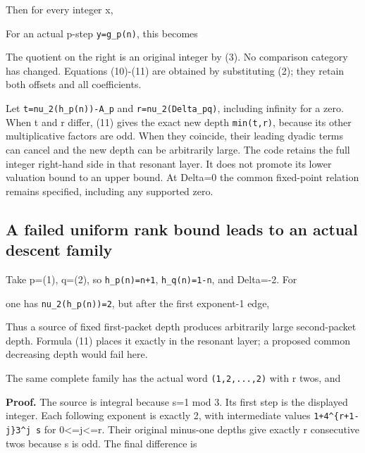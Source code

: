 Then for every integer x,


For an actual p-step \nolinkurl{y=g_p(n)}, this becomes


The quotient on the right is an original integer by (3). No comparison
category has changed. Equations (10)-(11) are obtained by substituting
(2); they retain both offsets and all coefficients.

Let \nolinkurl{t=nu_2(h_p(n))-A_p} and \nolinkurl{r=nu_2(Delta_pq)},
including infinity for a zero. When t and r differ, (11) gives the exact
new depth \nolinkurl{min(t,r)}, because its other multiplicative factors
are odd. When they coincide, their leading dyadic terms can cancel and
the new depth can be arbitrarily large. The code retains the full
integer right-hand side in that resonant layer. It does not promote its
lower valuation bound to an upper bound. At Delta=0 the common
fixed-point relation remains specified, including any supported zero.

\subsection{A failed uniform rank bound leads to an actual descent
family}

Take p=(1), q=(2), so \nolinkurl{h_p(n)=n+1}, \nolinkurl{h_q(n)=1-n},
and Delta=-2. For


one has \nolinkurl{nu_2(h_p(n))=2}, but after the first exponent-1 edge,


Thus a source of fixed first-packet depth produces arbitrarily large
second-packet depth. Formula (11) places it exactly in the resonant
layer; a proposed common decreasing depth would fail here.

The same complete family has the actual word \nolinkurl{(1,2,...,2)}
with r twos, and


\textbf{Proof.} The source is integral because s=1 mod 3. Its first step
is the displayed integer. Each following exponent is exactly 2, with
intermediate values \texttt{1+4\^{}\{r+1-j\}3\^{}j\ s} for
0\textless=j\textless=r. Their original minus-one depths give exactly r
consecutive twos because s is odd. The final difference is

